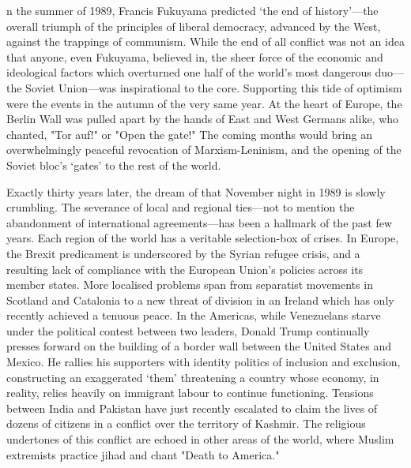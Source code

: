 \label{ch:open-the-gate}

{\flushright{}}
\smallskip

n the summer of 1989, Francis Fukuyama predicted `the end of
   history'---the overall triumph of the principles of liberal democracy,
   advanced by the West, against the trappings of communism. While the end
   of all conflict was not an idea that anyone, even Fukuyama, believed
   in, the sheer force of the economic and ideological factors which
   overturned one half of the world's most dangerous duo---the Soviet
   Union---was inspirational to the core. Supporting this tide of optimism
   were the events in the autumn of the very same year. At the heart of
   Europe, the Berlin Wall was pulled apart by the hands of East and West
   Germans alike, who chanted, "Tor auf!" or "Open the gate!" The coming
   months would bring an overwhelmingly peaceful revocation of
   Marxism-Leninism, and the opening of the Soviet bloc's `gates' to the
   rest of the world.

   Exactly thirty years later, the dream of that November night in 1989 is
   slowly crumbling. The severance of local and regional ties---not to
   mention the abandonment of international agreements---has been a
   hallmark of the past few years. Each region of the world has a
   veritable selection-box of crises. In Europe, the Brexit predicament is
   underscored by the Syrian refugee crisis, and a resulting lack of
   compliance with the European Union's policies across its member states.
   More localised problems span from separatist movements in Scotland and
   Catalonia to a new threat of division in an Ireland which has only
   recently achieved a tenuous peace. In the Americas, while Venezuelans
   starve under the political contest between two leaders, Donald Trump
   continually presses forward on the building of a border wall between
   the United States and Mexico. He rallies his supporters with identity
   politics of inclusion and exclusion, constructing an exaggerated `them'
   threatening a country whose economy, in reality, relies heavily on
   immigrant labour to continue functioning. Tensions between India and
   Pakistan have just recently escalated to claim the lives of dozens of
   citizens in a conflict over the territory of Kashmir. The religious
   undertones of this conflict are echoed in other areas of the world,
   where Muslim extremists practice jihad and chant "Death to America."

